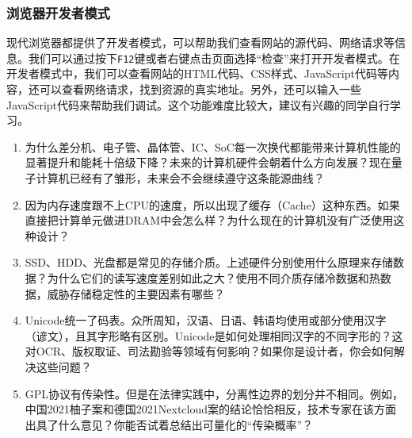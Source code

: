 \subsubsection{浏览器开发者模式}

现代浏览器都提供了开发者模式，可以帮助我们查看网站的源代码、网络请求等信息。我们可以通过按下\texttt{F12}键或者右键点击页面选择“检查”来打开开发者模式。在开发者模式中，我们可以查看网站的HTML代码、CSS样式、JavaScript代码等内容，还可以查看网络请求，找到资源的真实地址。另外，还可以输入一些JavaScript代码来帮助我们调试。这个功能难度比较大，建议有兴趣的同学自行学习。

\begin{thinking}
\begin{enumerate}
  \item 为什么差分机、电子管、晶体管、IC、SoC每一次换代都能带来计算机性能的显著提升和能耗十倍级下降？未来的计算机硬件会朝着什么方向发展？现在量子计算机已经有了雏形，未来会不会继续遵守这条能源曲线？
  \item 因为内存速度跟不上CPU的速度，所以出现了缓存（Cache）这种东西。如果直接把计算单元做进DRAM中会怎么样？为什么现在的计算机没有广泛使用这种设计？
  \item SSD、HDD、光盘都是常见的存储介质。上述硬件分别使用什么原理来存储数据？为什么它们的读写速度差别如此之大？使用不同介质存储冷数据和热数据，威胁存储稳定性的主要因素有哪些？
  \item Unicode统一了码表。众所周知，汉语、日语、韩语均使用或部分使用汉字（谚文），且其字形略有区别。Unicode是如何处理相同汉字的不同字形的？这对OCR、版权取证、司法勘验等领域有何影响？如果你是设计者，你会如何解决这些问题？
  \item GPL协议有传染性。但是在法律实践中，分离性边界的划分并不相同。例如，中国2021柚子案和德国2021Nextcloud案的结论恰恰相反，技术专家在该方面出具了什么意见？你能否试着总结出可量化的“传染概率”？
\end{enumerate}
\end{thinking}